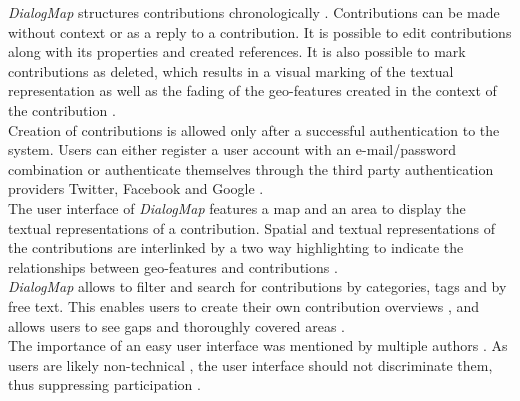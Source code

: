 \textit{DialogMap} structures contributions chronologically \cite{Cherubini2007_shared_maps,you2009_participatory_map_based}. Contributions can be made without context  or as a reply to a contribution. It is possible to edit contributions along with its properties and created references. It  is also possible to mark contributions as deleted, which results in a visual marking of the textual representation as well as the fading of the geo-features created in the context of the contribution \cite{Hopfer2007_Communication}.\\%
Creation of contributions is allowed only after a successful authentication to the system. Users can either register a user account with an e-mail/password combination or authenticate themselves through the third party authentication providers Twitter, Facebook and Google \cite{Sani2011_Scalable_Argumap,chun2014usability}. \\
The user interface of \textit{DialogMap} features a map and an area to display the textual representations of a contribution. Spatial and textual representations of the contributions are interlinked by a two way highlighting to indicate the relationships between geo-features and contributions \cite{Cai2009_spatial_annotation_deliberation,Sidlar2009-AssessmentMapGeocollaborationTool}.\\
\textit{DialogMap} allows to filter and search for contributions by categories, tags and by free text. This enables users to create their own contribution overviews \cite{Voss2004_Evolution_PGIS,you2009_participatory_map_based}, and allows users to see gaps and thoroughly covered areas \cite{Hopfer2007_Communication}.\\
The importance of an easy user interface was mentioned by multiple authors \cite{Rinner2009_Web2_argumap,Jankowski2005_community_based_pgis,Tang2005_PPGIS_discussion_forum,zhao2006geodf,you2009_participatory_map_based}. As users are likely non-technical \cite{Cai2009_spatial_annotation_deliberation}, the user interface should not discriminate them, thus suppressing participation \cite{Carver2001_PPGIS_Cyberdemocracy}.\\ %
